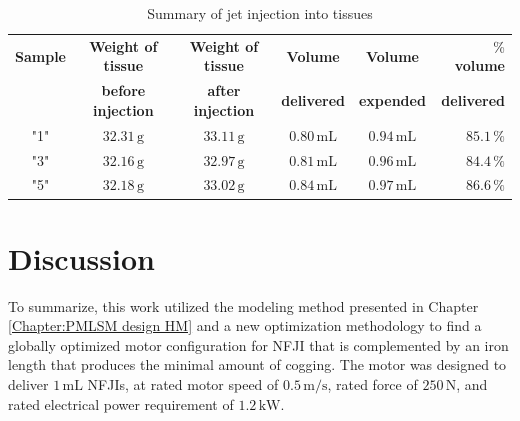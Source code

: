            
            \begin{table}[h]
                \renewcommand{\arraystretch}{1.2}
                \caption{Summary of jet injection into tissues}
                \label{table:chap/validation/exp/injection_into_tissue}
                \centering
                \begin{tabular}{c|cccc|r}
                \hline
                \textbf{Sample} & \textbf{Weight of tissue} & \textbf{Weight of tissue} & \textbf{Volume}     & \textbf{Volume} & \% \textbf{volume}  \\
                             & \textbf{before injection} & \textbf{after injection}  & \textbf{delivered}  & \textbf{expended}        & \textbf{delivered}\\
                \hline
                "1"          & $32.31\,\mathrm{g}$               & $33.11\,\mathrm{g}$              & $0.80\,\mathrm{mL}$ & $0.94\,\mathrm{mL}$      & $85.1\,\%$          \\
                "3"          & $32.16\,\mathrm{g}$               & $32.97\,\mathrm{g}$              & $0.81\,\mathrm{mL}$ & $0.96\,\mathrm{mL}$      & $84.4\,\%$          \\
                "5"          & $32.18\,\mathrm{g}$               & $33.02\,\mathrm{g}$              & $0.84\,\mathrm{mL}$ & $0.97\,\mathrm{mL}$      & $86.6\,\%$         \\
                \hline
                \end{tabular}
            \end{table}
        
        
        \section{Discussion}                     \label{Chapter:experiment/validation/discussion}
        
        
            To summarize, this work utilized the modeling method presented in Chapter\,\ref{Chapter:PMLSM design HM} and a new optimization methodology to find a globally optimized motor configuration for NFJI that is complemented by an iron length that produces the minimal amount of cogging. The motor was designed to deliver $1\,\mathrm{mL}$ NFJIs, at rated motor speed of $0.5\,\mathrm{m/s}$, rated force of $250\,\mathrm{N}$, and rated electrical power requirement of $1.2\,\mathrm{kW}$. 
            
